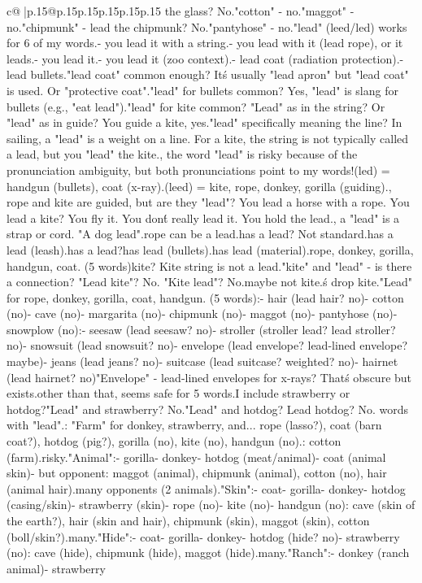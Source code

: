 \documentclass{article}
\begin{document}
{\begin{supertabular}{c@{$\;$}|p{.15\linewidth}@{}p{.15\linewidth}p{.15\linewidth}p{.15\linewidth}p{.15\linewidth}p{.15\linewidth}}
{{{the glass? No.\n"cotton" - no.\n"maggot" - no.\n"chipmunk" - lead the chipmunk? No.\n"pantyhose" - no.\n\nSo "lead" (leed/led) works for 6 of my words.\nKite - you lead it with a string.\nRope - you lead with it (lead rope), or it leads.\nDonkey - you lead it.\nGorilla - you lead it (zoo context).\nCoat - lead coat (radiation protection).\nHandgun - lead bullets.\n\nIs "lead coat" common enough? It\'s usually "lead apron" but "lead coat" is used. Or "protective coat".\nIs "lead" for bullets common? Yes, "lead" is slang for bullets (e.g., "eat lead").\nIs "lead" for kite common? "Lead" as in the string? Or "lead" as in guide? You guide a kite, yes.\nBut "lead" specifically meaning the line? In sailing, a "lead" is a weight on a line. For a kite, the string is not typically called a lead, but you "lead" the kite.\nHowever, the word "lead" is risky because of the pronunciation ambiguity, but both pronunciations point to my words!\nLead (led) = handgun (bullets), coat (x-ray).\nLead (leed) = kite, rope, donkey, gorilla (guiding).\nWait, rope and kite are guided, but are they "lead"? You lead a horse with a rope. You lead a kite? You fly it. You don\'t really lead it. You hold the lead.\nActually, a "lead" is a strap or cord. "A dog lead".\nSo rope can be a lead.\nKite has a lead? Not standard.\nDonkey has a lead (leash).\nGorilla has a lead?\nHandgun has lead (bullets).\nCoat has lead (material).\nSo rope, donkey, gorilla, handgun, coat. (5 words)\nAnd kite? Kite string is not a lead.\nBut "kite" and "lead" - is there a connection? "Lead kite"? No. "Kite lead"? No.\nSo maybe not kite.\n\nLet\'s drop kite.\n"Lead" for rope, donkey, gorilla, coat, handgun. (5 words)\nOpponents:\n- hair (lead hair? no)\n- cotton (no)\n- cave (no)\n- margarita (no)\n- chipmunk (no)\n- maggot (no)\n- pantyhose (no)\n- snowplow (no)\n\nDistractors:\n- seesaw (lead seesaw? no)\n- stroller (stroller lead? lead stroller? no)\n- snowsuit (lead snowsuit? no)\n- envelope (lead envelope? lead-lined envelope? maybe)\n- jeans (lead jeans? no)\n- suitcase (lead suitcase? weighted? no)\n- hairnet (lead hairnet? no)\n\n"Envelope" - lead-lined envelopes for x-rays? That\'s obscure but exists.\nBut other than that, seems safe for 5 words.\n\nCan I include strawberry or hotdog?\n"Lead" and strawberry? No.\n"Lead" and hotdog? Lead hotdog? No.\n{} words with "lead".\n\nAlternative: "Farm" for donkey, strawberry, and... rope (lasso?), coat (barn coat?), hotdog (pig?), gorilla (no), kite (no), handgun (no).\nOpponent: cotton (farm).\nToo risky.\n\n"Animal":\n- gorilla\n- donkey\n- hotdog (meat/animal)\n- coat (animal skin)\n- but opponent: maggot (animal), chipmunk (animal), cotton (no), hair (animal hair).\nToo many opponents (2 animals).\n\n"Skin":\n- coat\n- gorilla\n- donkey\n- hotdog (casing/skin)\n- strawberry (skin)\n- rope (no)\n- kite (no)\n- handgun (no)\nOpponent: cave (skin of the earth?), hair (skin and hair), chipmunk (skin), maggot (skin), cotton (boll/skin?).\nToo many.\n\n"Hide":\n- coat\n- gorilla\n- donkey\n- hotdog (hide? no)\n- strawberry (no)\nOpponent: cave (hide), chipmunk (hide), maggot (hide).\nToo many.\n\n"Ranch":\n- donkey (ranch animal)\n- strawberry }}}
\end{supertabular}}
\end{document}
